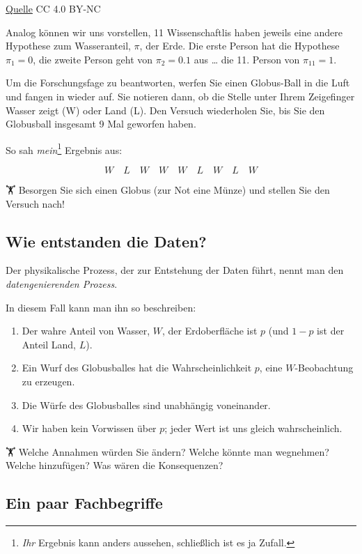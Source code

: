 \documentclass[
  a4paper,
  DIV=11]{scrreprt}
\providecommand{\tightlist}{%
  \setlength{\itemsep}{0pt}\setlength{\parskip}{0pt}}\usepackage{longtable,booktabs,array}
\theoremstyle{definition}
\theoremstyle{remark}
\begin{document}
\href{https://pngimg.com/image/25340}{Quelle} CC 4.0 BY-NC

Analog können wir uns vorstellen, 11 Wissenschaftlis haben jeweils eine
andere Hypothese zum Wasseranteil, \(\pi\), der Erde. Die erste Person
hat die Hypothese \(\pi_1 = 0\), die zweite Person geht von
\(\pi_2 = 0.1\) aus \ldots{} die 11. Person von \(\pi_{11} = 1\).

Um die Forschungsfage zu beantworten, werfen Sie einen Globus-Ball in
die Luft und fangen in wieder auf. Sie notieren dann, ob die Stelle
unter Ihrem Zeigefinger Wasser zeigt (W) oder Land (L). Den Versuch
wiederholen Sie, bis Sie den Globusball insgesamt 9 Mal geworfen haben.

So sah \emph{mein}\footnote{\emph{Ihr} Ergebnis kann anders aussehen,
  schließlich ist es ja Zufall.} Ergebnis aus:

\[W \quad L \quad W \quad W \quad W \quad L \quad W \quad L \quad W\]

🏋️️ Besorgen Sie sich einen Globus (zur Not eine Münze) und stellen Sie
den Versuch nach!

\hypertarget{wie-entstanden-die-daten}{%
\subsection{Wie entstanden die Daten?}\label{wie-entstanden-die-daten}}

Der physikalische Prozess, der zur Entstehung der Daten führt, nennt man
den \emph{datengenierenden Prozess}.

In diesem Fall kann man ihn so beschreiben:

\begin{enumerate}
\def\labelenumi{\arabic{enumi}.}
\tightlist
\item
  Der wahre Anteil von Wasser, \(W\), der Erdoberfläche ist \(p\) (und
  \(1-p\) ist der Anteil Land, \(L\)).
\item
  Ein Wurf des Globusballes hat die Wahrscheinlichkeit \(p\), eine
  \(W\)-Beobachtung zu erzeugen.
\item
  Die Würfe des Globusballes sind unabhängig voneinander.
\item
  Wir haben kein Vorwissen über \(p\); jeder Wert ist uns gleich
  wahrscheinlich.
\end{enumerate}

🏋 Welche Annahmen würden Sie ändern? Welche könnte man wegnehmen? Welche
hinzufügen? Was wären die Konsequenzen?

\hypertarget{ein-paar-fachbegriffe}{%
\subsection{Ein paar Fachbegriffe}\label{ein-paar-fachbegriffe}}
\end{document}
